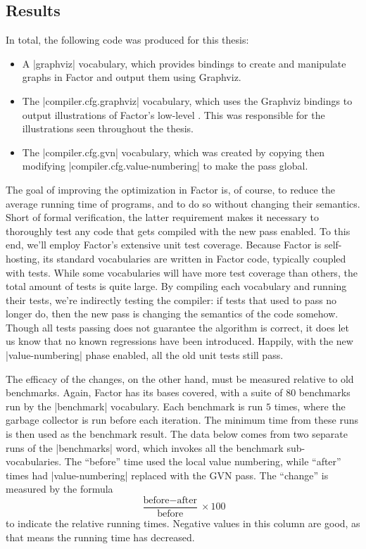 \subsection{Results}\label{sec:vn:results}


In total, the following code was produced for this thesis:
\begin{itemize}
  \item A \factor|graphviz| vocabulary, which provides bindings to create and
        manipulate graphs in Factor and output them using Graphviz.
  \item The \factor|compiler.cfg.graphviz| vocabulary, which uses the Graphviz
        bindings to output illustrations of Factor's low-level .
        This was responsible for the illustrations seen throughout the thesis.
  \item The \factor|compiler.cfg.gvn| vocabulary, which was created by copying
        then modifying \factor|compiler.cfg.value-numbering| to make the pass
        global.
\end{itemize}

The goal of improving the optimization in Factor is, of course, to reduce the
average running time of programs, and to do so without changing their
semantics.  Short of formal verification, the latter requirement makes it
necessary to thoroughly test any code that gets compiled with the new pass
enabled.  To this end, we'll employ Factor's extensive unit test coverage.
Because Factor is self-hosting, its standard vocabularies are written in Factor
code, typically coupled with tests.  While some vocabularies will have more
test coverage than others, the total amount of tests is quite large.  By
compiling each vocabulary and running their tests, we're indirectly testing the
compiler: if tests that used to pass no longer do, then the new pass is
changing the semantics of the code somehow.  Though all tests passing does not
guarantee the algorithm is correct, it does let us know that no known
regressions have been introduced.  Happily, with the new
\factor|value-numbering| phase enabled, all the old unit tests still pass.

The efficacy of the changes, on the other hand, must be measured relative to
old benchmarks.  Again, Factor has its bases covered, with a suite of $80$
benchmarks run by the \factor|benchmark| vocabulary.  Each benchmark is run $5$
times, where the garbage collector is run before each iteration.  The minimum
time from these runs is then used as the benchmark result.  The data below
comes from two separate runs of the \factor|benchmarks| word, which invokes all
the benchmark sub-vocabularies.  The ``before'' time used the local value
numbering, while ``after'' times had \factor|value-numbering| replaced with the
\gls{GVN} pass.  The ``change'' is measured by the formula
%
$$\frac{\text{before} - \text{after}}{\text{before}} \times 100$$
%
to indicate the relative running times.  Negative values in this column are
good, as that means the running time has decreased.

